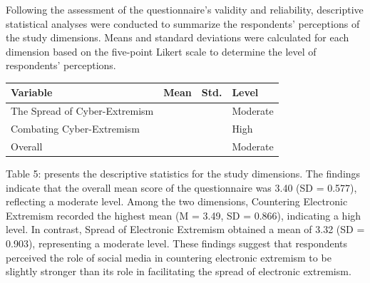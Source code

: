 \documentclass[10pt]{NSP1}
\makeatletter
\newcommand\jltx@wideopen{\par\addvspace{\medskipamount}\noindent}
\newcommand\jltx@wideclose{\par\addvspace{\medskipamount}}
\newenvironment{jltxspan}
  {\if@twocolumn\let\jltx@spannext\strip\else\let\jltx@spannext\jltx@wideopen\fi\jltx@spannext}
  {\if@twocolumn\let\jltx@spanend\endstrip\else\let\jltx@spanend\jltx@wideclose\fi\jltx@spanend}
\newcommand\JLTXaboveplacement{\par\addvspace{6pt plus 2pt minus 2pt}\noindent}
\newcommand\JLTXbelowplacement{\par\addvspace{6pt plus 2pt minus 2pt}}
\makeatother
\begin{document}
\par\vspace{5.0pt}\vspace{5.0pt}

Following the assessment of the questionnaire's validity and reliability, descriptive statistical analyses were conducted to summarize the respondents' perceptions of the study dimensions. Means and standard deviations were calculated for each dimension based on the five-point Likert scale to determine the level of respondents' perceptions.

\JLTXaboveplacement \begin{jltxspan}%
\noindent\begin{minipage}{\linewidth}%
\centering
{\small
\begin{tabular}{|>{\raggedright\arraybackslash}p{}|>{\centering\arraybackslash}p{}|>{\centering\arraybackslash}p{}|>{\centering\arraybackslash}p{}|}
\hline
\cellcolor[HTML]{DDD9C3}\textbf{Variable} & \cellcolor[HTML]{DDD9C3}\textbf{Mean} & \cellcolor[HTML]{DDD9C3}\textbf{Std.} & \cellcolor[HTML]{DDD9C3}\textbf{Level} \\
\hline
\cellcolor[HTML]{DDD9C3}The Spread of Cyber-Extremism & 3.32 & 0.903 & Moderate \\
\hline
\cellcolor[HTML]{DDD9C3}Combating Cyber-Extremism & 3.49 & 0.866 & High \\
\hline
\cellcolor[HTML]{DDD9C3}Overall & 3.40 & 0.577 & Moderate \\
\hline
\end{tabular}}
%
\end{minipage}%
\end{jltxspan}\JLTXbelowplacement 

Table 5: presents the descriptive statistics for the study dimensions. The findings indicate that the overall mean score of the questionnaire was 3.40 (SD = 0.577), reflecting a moderate level. Among the two dimensions, Countering Electronic Extremism recorded the highest mean (M = 3.49, SD = 0.866), indicating a high level. In contrast, Spread of Electronic Extremism obtained a mean of 3.32 (SD = 0.903), representing a moderate level. These findings suggest that respondents perceived the role of social media in countering electronic extremism to be slightly stronger than its role in facilitating the spread of electronic extremism.
\end{document}
